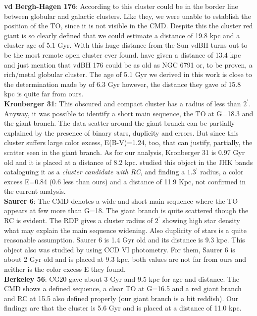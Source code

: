 \documentclass[draft]{aa}
\begin{document}
\textbf{vd Bergh-Hagen 176}: According to \cite{Ortolani_1995} this cluster
could be in the border line between globular and galactic clusters. Like
they, we were unable to establish the position of the TO, since it is not visible
in the CMD. Despite this the cluster red giant is so clearly defined that we
could estimate a distance of 19.8 kpc and a cluster age of 5.1 Gyr. With this huge 
distance from the Sun vdBH turns out to be the most remote open cluster ever found.
\cite{Ortolani_1995} have given a distance of 13.4 kpc and just mention
that vdBH 176 could be as old as NGC 6791 or, to be proven, a rich/metal
globular cluster. The age of 5.1 Gyr we derived in this work is close
to the determination made by \cite{Frinchaboy_2006} of 6.3 Gyr however,
the distance they gave of 15.8 kpc is quite far from ours.\\

\textbf{Kronberger 31}: This obscured and compact cluster has a radius
of less than $2^{\prime}$. Anyway, it was possible to identify a short
main sequence, the TO at G=18.3 and the giant branch. The data scatter
around the giant branch can be partially explained by the presence of
binary stars, duplicity and errors. But since this cluster suffers large
color excess, E(B-V)=1.24, too, that can justify, partially, the scatter
seen in the giant branch. As for our analysis, Kronberger 31 is 0.97 Gyr
old and it is placed at a distance of 8.2 kpc. \cite{Kronberger_2006}
studied this object in the JHK bands cataloguing it as a \emph{cluster
candidate with RC}, and finding a $1.3^{\prime}$ radius, a color
excess E=0.84 (0.6 less than ours) and a distance of 11.9 Kpc, not
confirmed in the current analysis.\\

\textbf{Saurer 6}: The CMD denotes a wide and short main sequence where the TO
appears at few more than G=18. The giant branch is quite scattered though the
RC is evident. The RDP gives a cluster radius of $2^{\prime}$ showing high
star density what may explain the main sequence widening. Also duplicity of
stars is a quite reasonable assumption. Saurer 6 is 1.4 Gyr old and its
distance is 9.3 kpc. This object also was studied by
\cite{Frinchaboy_2002} using CCD VI photometry. For them, Saurer 6 is about 2
Gyr old and is placed at 9.3 kpc, both values are not far from ours and
neither is the color excess E they found.\\

\textbf{Berkeley 56}: CG20 gave about 3 Gyr and 9.5 kpc for age and distance. The CMD
shows a defined sequence, a clear TO at G=16.5 and a red giant branch and RC
at 15.5 also defined properly (our giant branch is a bit reddish).  Our
findings are that the cluster is 5.6 Gyr and is placed at a distance of 11.0
kpc.\\
\end{document}
